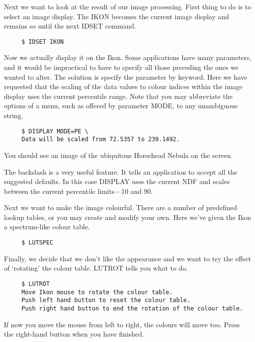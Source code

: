 Next we want to look at the result of our image processing.  First thing
to do is to select an image display.  The IKON becomes the current
image display and remains so until the next IDSET command.

\small
\begin{verbatim}
     $ IDSET IKON
\end{verbatim}
\normalsize

Now we actually display it on the Ikon.   Some applications have
many parameters, and it would be impractical to have to specify all
those preceding the ones we wanted to alter.  The solution is specify
the parameter by keyword.  Here we have requested that the scaling of
the data values to colour indices within the image display uses the
current percentile range.  Note that you may abbreviate the options
of a menu, such as offered by parameter MODE, to any unambiguous
string.

\small
\begin{verbatim}
     $ DISPLAY MODE=PE \
     Data will be scaled from 72.5357 to 239.1492.
\end{verbatim}
\normalsize

You should see an image of the ubiquitous Horsehead Nebula on the screen.

The backslash is a very useful feature.  It tells an application to
accept all the suggested defaults. In this case DISPLAY uses the current
NDF and scales between the current percentile limits---10 and 90.

Next we want to make the image colourful.  There are a number of
predefined lookup tables, or you may create and modify
your own.  Here we've given the Ikon a spectrum-like colour table. 

\small
\begin{verbatim}
     $ LUTSPEC
\end{verbatim}
\normalsize

Finally, we decide that we don't like the appearance and we want to
try the effect of `rotating' the colour table.  LUTROT tells you
what to do.

\small
\begin{verbatim}
     $ LUTROT
     Move Ikon mouse to rotate the colour table.
     Push left hand button to reset the colour table.
     Push right hand button to end the rotation of the colour table.
\end{verbatim}
\normalsize

If now you move the mouse from left to right, the colours will move too.
Press the right-hand button when you have finished.

